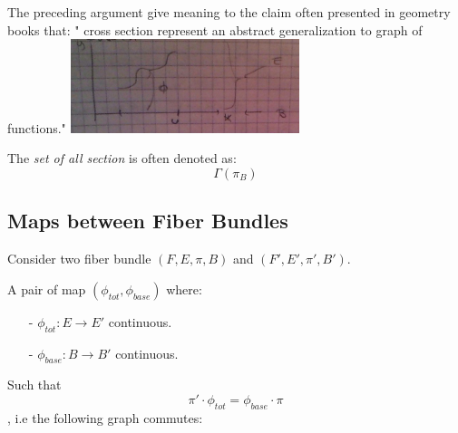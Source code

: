 \documentclass[a4paper,12pt]{scrartcl}    %
\begin{document}
\begin{observation}
The preceding argument give meaning to the claim often presented in geometry books that: " cross section represent an abstract generalization to graph of functions."
\includegraphics[width=0.5\textwidth]{TempPictures/SectionasGraph.jpg}
\end{observation}

\begin{notationfix}
The \emph{set of all section} is often denoted as:
$$\Gamma(\pi_B) $$
\end{notationfix}

\subsection{Maps between Fiber Bundles}
Consider two fiber bundle $(F,E,\pi,B)$ and $(F',E',\pi',B')$.


\begin{definition}
A pair of map $(\phi_{tot}, \phi_{base})$ where:
\begin{itemize}
\item[-] $\phi_{tot}:E \rightarrow E'$ continuous.
\item[-] $\phi_{base}:B \rightarrow B'$ continuous.
\end{itemize}
Such that 
\begin{equation}\label{eq:fiberbundle}
\pi' \cdot \phi_{tot} = \phi_{base} \cdot \pi
\end{equation}
, i.e the following graph commutes:
\end{definition}
\end{document}
